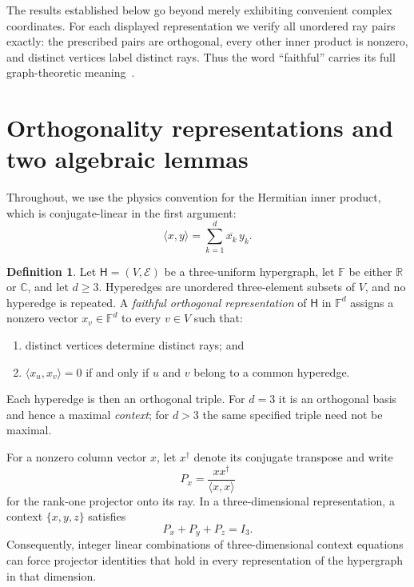 \documentclass[12pt,a4paper]{article}
\theoremstyle{definition}
\newtheorem{definition}[theorem]{Definition}
\theoremstyle{remark}
\newcommand{\C}{\mathbb C}
\newcommand{\R}{\mathbb R}
\begin{document}
The results established below go beyond merely exhibiting convenient complex
coordinates.  For each displayed representation we verify all unordered ray
pairs exactly: the prescribed pairs are orthogonal, every other inner product
is nonzero, and distinct vertices label distinct rays.  Thus the word
``faithful'' carries its full graph-theoretic meaning~\cite{lovasz-79,Portillo-2015}.

\section{Orthogonality representations and two algebraic lemmas}

Throughout, we use the physics convention for the Hermitian inner product,
which is conjugate-linear in the first argument:
\begin{equation}
 \langle x,y\rangle=\sum_{k=1}^{d}\overline{x_k}\,y_k.
 \label{eq:inner-product}
\end{equation}

\begin{definition}
Let $\mathsf H=(V,\mathcal E)$ be a three-uniform hypergraph, let
$\mathbb F$ be either $\R$ or $\C$, and let $d\ge3$.
Hyperedges are unordered three-element subsets of $V$, and no hyperedge
is repeated.  A \emph{faithful orthogonal representation} of $\mathsf H$ in $\mathbb F^d$ assigns a nonzero
vector $x_v\in\mathbb F^d$ to every $v\in V$ such that:
\begin{enumerate}
\item distinct vertices determine distinct rays; and
\item $\langle x_u,x_v\rangle=0$ if and only if $u$ and $v$ belong to a
common hyperedge.
\end{enumerate}
Each hyperedge is then an orthogonal triple.  For $d=3$ it is an orthogonal
basis and hence a maximal \emph{context}; for $d>3$ the same specified triple
need not be maximal.
\end{definition}

For a nonzero column vector $x$, let $x^\dagger$ denote its conjugate
transpose and write
\begin{equation}
 P_x=\frac{xx^\dagger}{\langle x,x\rangle}
 \label{eq:projector}
\end{equation}
for the rank-one projector onto its ray.  In a three-dimensional
representation, a context $\{x,y,z\}$ satisfies
\begin{equation}
 P_x+P_y+P_z=I_3.
 \label{eq:context-sum}
\end{equation}
Consequently, integer linear combinations of three-dimensional context
equations can force projector identities that hold in every representation
of the hypergraph in that dimension.
\end{document}
